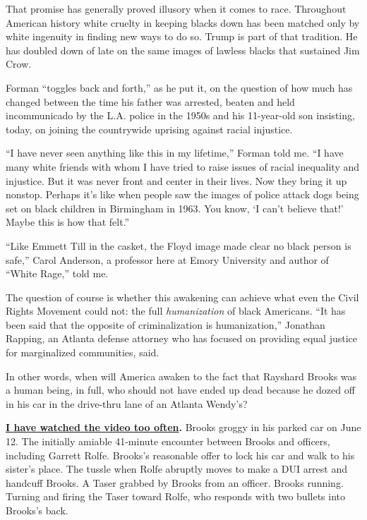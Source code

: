 That promise has generally proved illusory when it comes to race.
Throughout American history white cruelty in keeping blacks down has
been matched only by white ingenuity in finding new ways to do so. Trump
is part of that tradition. He has doubled down of late on the same
images of lawless blacks that sustained Jim Crow.

Forman ``toggles back and forth,'' as he put it, on the question of how
much has changed between the time his father was arrested, beaten and
held incommunicado by the L.A. police in the 1950s and his 11-year-old
son insisting, today, on joining the countrywide uprising against racial
injustice.

``I have never seen anything like this in my lifetime,'' Forman told me.
``I have many white friends with whom I have tried to raise issues of
racial inequality and injustice. But it was never front and center in
their lives. Now they bring it up nonstop. Perhaps it's like when people
saw the images of police attack dogs being set on black children in
Birmingham in 1963. You know, `I can't believe that!' Maybe this is how
that felt.''

``Like Emmett Till in the casket, the Floyd image made clear no black
person is safe,'' Carol Anderson, a professor here at Emory University
and author of ``White Rage,'' told me.

The question of course is whether this awakening can achieve what even
the Civil Rights Movement could not: the full \emph{humanization} of
black Americans. ``It has been said that the opposite of criminalization
is humanization,'' Jonathan Rapping, an Atlanta defense attorney who has
focused on providing equal justice for marginalized communities, said.

In other words, when will America awaken to the fact that Rayshard
Brooks was a human being, in full, who should not have ended up dead
because he dozed off in his car in the drive-thru lane of an Atlanta
Wendy's?

\textbf{\href{https://www.nytimes.com/2020/06/14/us/videos-rayshard-brooks-shooting-atlanta-police.html}{I
have watched the video too often}.} Brooks groggy in his parked car on
June 12. The initially amiable 41-minute encounter between Brooks and
officers, including Garrett Rolfe. Brooks's reasonable offer to lock his
car and walk to his sister's place. The tussle when Rolfe abruptly moves
to make a DUI arrest and handcuff Brooks. A Taser grabbed by Brooks from
an officer. Brooks running. Turning and firing the Taser toward Rolfe,
who responds with two bullets into Brooks's back.

